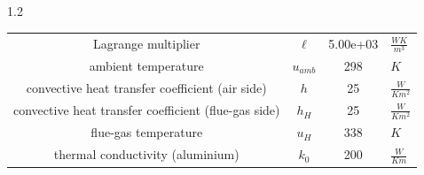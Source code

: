 \documentclass[preview]{standalone}
\begin{document}
\begin{spacing}{1.2}
\begin{tabular}{cccl}
\toprule
Lagrange multiplier & $\ell$ & 5.00e+03 & $\frac{W K}{m^3}$ \\ 
ambient temperature & $u_{amb}$ & 298 & $K$ \\ 
convective heat transfer coefficient (air side) & $h$ & 25 & $\frac{W}{K m^2}$ \\ 
convective heat transfer coefficient (flue-gas side) & $h_{H}$ & 25 & $\frac{W}{K m^2}$ \\ 
flue-gas temperature & $u_{H}$ & 338 & $K$ \\ 
thermal conductivity (aluminium) & $k_{0}$ & 200 & $\frac{W}{K m}$ \\ 
\bottomrule
\end{tabular}
\end{spacing}
\end{document}
